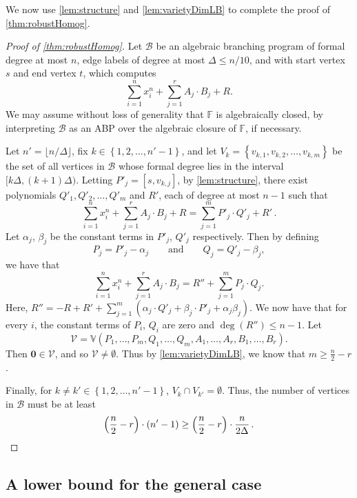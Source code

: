 \documentclass[10pt,a4paper]{article}
\newcommand{\F}{\mathbb F}
\newcommand{\set}[1]{\left\{#1\right\}}
\newcommand{\inparen}[1]{\left(#1\right)}
\begin{document}
We now use \autoref{lem:structure} and \autoref{lem:varietyDimLB} to complete the proof of \autoref{thm:robustHomog}.

\begin{proof}[Proof of \autoref{thm:robustHomog}]
	Let $\mathcal{B}$ be an algebraic branching program of formal degree at most $n$, edge labels of degree at most $\Delta \le n/10$, and with start vertex $s$ and end vertex $t$, which computes
	\[\sum_{i = 1}^n x_i^n + \sum_{j = 1}^r A_j\cdot B_j + R.\]
	We may assume without loss of generality that $\F$ is algebraically closed, by interpreting $\mathcal{B}$ as an ABP over the algebraic closure of $\F$, if necessary.
		
	Let $n' = \lfloor n/\Delta \rfloor$, fix $k \in \set{1, 2, \ldots ,n'-1}$, and let $V_k = \set{v_{k,1}, v_{k,2}, \ldots, v_{k,m}}$ be the set of all vertices in $\mathcal{B}$ whose formal degree lies in the interval $[k\Delta, (k+1)\Delta)$.  Letting $P'_j = [s,v_{k,j}]$, by \autoref{lem:structure}, there exist polynomials $Q'_1, Q'_2, \ldots, Q'_m$ and $R'$, each of degree at most $n-1$ such that
	\[
		\sum_{i = 1}^n x_i^n + \sum_{j = 1}^r A_j\cdot B_j + R = \sum_{j=1}^{m} P'_j \cdot Q'_j + R'\, .
	\]
	Let $\alpha_j$, $\beta_j$ be the constant terms in $P'_j$, $Q'_j$ respectively. Then by defining
	\[P_j = P'_j - \alpha_j \qquad \text{and} \qquad Q_j = Q'_j - \beta_j,\]
	we have that
	\[
		\sum_{i=1}^{n} x_i^n + \sum_{j=1}^{r} A_j \cdot B_j = R'' + \sum_{j=1}^{m} P_j \cdot Q_j.
	\]
	Here, $R'' = -R + R' + \sum_{j=1}^{m} (\alpha_j \cdot Q'_j + \beta_j \cdot P'_j + \alpha_j \beta_j)$. We now have that for every $i$, the constant terms of $P_i$, $Q_i$ are zero and $\deg(R'') \leq n-1$.
	Let 
	\[
		\mathcal{V} = \mathbb{V}(P_1, \ldots, P_m, Q_1, \ldots, Q_m, A_1, \ldots, A_r, B_1, \ldots, B_r).
	\]
	Then $\mathbf{0} \in \mathcal{V}$, and so $\mathcal{V} \neq \emptyset$. Thus by \autoref{lem:varietyDimLB}, we know that $m \geq \frac{n}{2} - r$.
		
	Finally, for $ k\neq k' \in \set{1, 2, \ldots, n'-1}$, $V_k \cap V_{k'} = \emptyset$. Thus, the number of vertices in $\mathcal{B}$ must be at least
	\[
		\inparen{\dfrac{n}{2} - r} \cdot (n'-1) \geq \inparen{\frac{n}{2} - r}\cdot  \frac{n}{2\Delta}\,.
		\qedhere
	\]
\end{proof}
	

\subsection{A lower bound for the general case}
\end{document}
